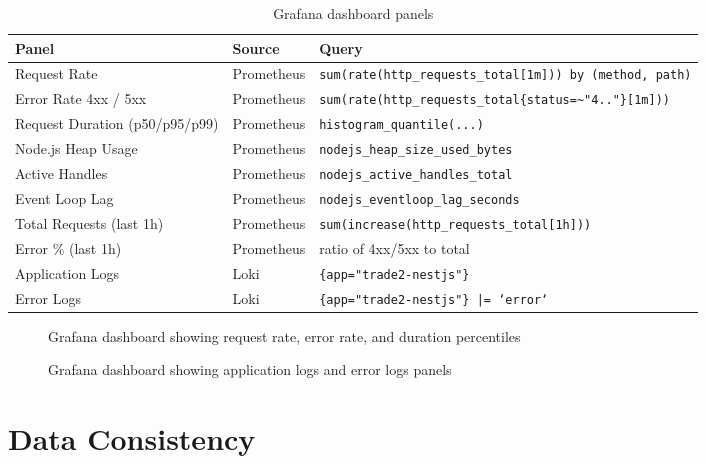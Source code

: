 \documentclass[12pt, a4paper]{article}
\begin{document}
\begin{table}[H]
    \centering
    \begin{tabular}{@{}llp{6cm}@{}}
        \toprule
        \textbf{Panel} & \textbf{Source} & \textbf{Query} \\
        \midrule
        Request Rate & Prometheus & \texttt{sum(rate(http\_requests\_total[1m])) by (method, path)} \\
        Error Rate 4xx / 5xx & Prometheus & \texttt{sum(rate(http\_requests\_total\{status=\textasciitilde"4.."\}[1m]))} \\
        Request Duration (p50/p95/p99) & Prometheus & \texttt{histogram\_quantile(...)} \\
        Node.js Heap Usage & Prometheus & \texttt{nodejs\_heap\_size\_used\_bytes} \\
        Active Handles & Prometheus & \texttt{nodejs\_active\_handles\_total} \\
        Event Loop Lag & Prometheus & \texttt{nodejs\_eventloop\_lag\_seconds} \\
        Total Requests (last 1h) & Prometheus & \texttt{sum(increase(http\_requests\_total[1h]))} \\
        Error \% (last 1h) & Prometheus & ratio of 4xx/5xx to total \\
        Application Logs & Loki & \texttt{\{app="trade2-nestjs"\}} \\
        Error Logs & Loki & \texttt{\{app="trade2-nestjs"\} |= `error`} \\
        \bottomrule
    \end{tabular}
    \caption{Grafana dashboard panels}
\end{table}

\begin{figure}[H]
    \centering
    \fbox{\rule{0pt}{6cm}\rule{12cm}{0pt}}
    \caption{Grafana dashboard showing request rate, error rate, and duration percentiles}
    \label{fig:grafana-metrics}
\end{figure}

\begin{figure}[H]
    \centering
    \fbox{\rule{0pt}{6cm}\rule{12cm}{0pt}}
    \caption{Grafana dashboard showing application logs and error logs panels}
    \label{fig:grafana-logs}
\end{figure}

\section{Data Consistency}
\end{document}
